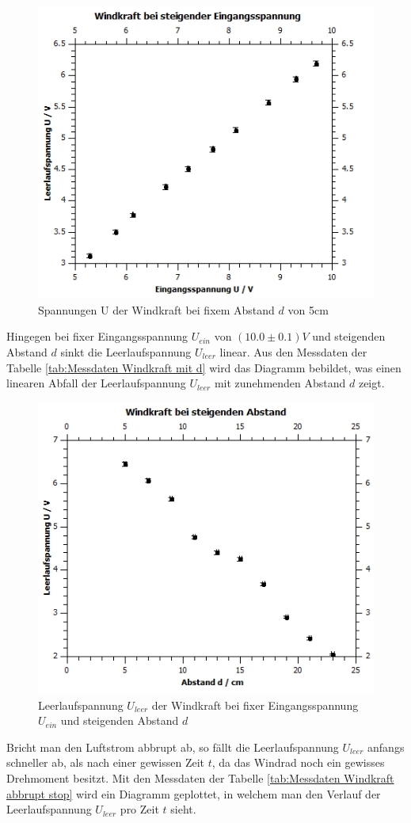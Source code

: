 \documentclass[12pt,a4paper,twoside]{article}
\begin{document}
\begin{figure}[H]
    \centering
    \includegraphics[width=0.6\linewidth]{nudes/wind spannung.jpg}
    \caption{Spannungen U der Windkraft bei fixem Abstand $d$ von 5cm}
    \label{fig:windkraft stationär diagramm}
\end{figure}

\noindent
Hingegen bei fixer Eingangsspannung $U_{ein}$ von $(10.0 \pm 0.1)V$ und steigenden Abstand $d$ sinkt die Leerlaufspannung $U_{leer}$ linear. 
Aus den Messdaten der Tabelle \ref{tab:Messdaten Windkraft mit d} wird das Diagramm bebildet, was einen linearen Abfall der Leerlaufspannung $U_{leer}$ mit zunehmenden Abstand $d$ zeigt. 

\begin{figure}[H]
    \centering
    \includegraphics[width=0.6\linewidth]{nudes/wind abstand.jpg}
    \caption{Leerlaufspannung $U_{leer}$ der Windkraft bei fixer Eingangsspannung $U_{ein}$ und steigenden Abstand $d$}
    \label{fig:windkraft abstand diagramm}
\end{figure}

\noindent
Bricht man den Luftstrom abbrupt ab, so fällt die Leerlaufspannung $U_{leer}$ anfangs schneller ab, als nach einer gewissen Zeit $t$, da das Windrad noch ein gewisses Drehmoment besitzt. 
Mit den Messdaten der Tabelle \ref{tab:Messdaten Windkraft abbrupt stop} wird ein Diagramm geplottet, in welchem man den Verlauf der Leerlaufspannung $U_{leer}$ pro Zeit $t$ sieht. 
\end{document}
